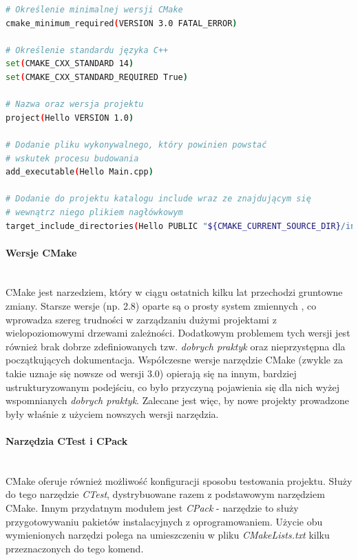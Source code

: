 \begin{lstlisting}[language=bash,caption={Przykład prostego pliku CMakeLists.txt przeznaczonego do budowania programu napisanego w C++}, label={lst:hello}]
# Określenie minimalnej wersji CMake
cmake_minimum_required(VERSION 3.0 FATAL_ERROR)

# Określenie standardu języka C++
set(CMAKE_CXX_STANDARD 14)
set(CMAKE_CXX_STANDARD_REQUIRED True)

# Nazwa oraz wersja projektu
project(Hello VERSION 1.0)

# Dodanie pliku wykonywalnego, który powinien powstać
# wskutek procesu budowania
add_executable(Hello Main.cpp)

# Dodanie do projektu katalogu include wraz ze znajdującym się 
# wewnątrz niego plikiem nagłówkowym
target_include_directories(Hello PUBLIC "${CMAKE_CURRENT_SOURCE_DIR}/include")
\end{lstlisting}

\paragraph*{Wersje CMake}\mbox{} \\
CMake jest narzedziem, który w ciągu ostatnich kilku lat przechodzi gruntowne zmiany. Starsze wersje (np. 2.8) oparte są o prosty system zmiennych \cite{CMakeRight}, co wprowadza szereg trudności w zarządzaniu dużymi projektami z wielopoziomowymi drzewami zależności. Dodatkowym problemem tych wersji jest również brak dobrze zdefiniowanych tzw. \textit{dobrych praktyk} oraz nieprzystępna dla początkujących dokumentacja. Współczesne wersje narzędzie CMake (zwykle za takie uznaje się nowsze od wersji 3.0) opierają się na innym, bardziej ustrukturyzowanym \cite{CMakeRight} podejściu, co było przyczyną pojawienia się dla nich wyżej wspomnianych \textit{dobrych praktyk}. Zalecane jest więc, by nowe projekty prowadzone były właśnie z użyciem nowszych wersji narzędzia.

\paragraph*{Narzędzia CTest i CPack}\mbox{} \\
CMake oferuje również możliwość konfiguracji sposobu testowania projektu. Służy do tego narzędzie \textit{CTest}, dystrybuowane razem z podstawowym narzędziem CMake. Innym przydatnym modułem jest \textit{CPack} - narzędzie to służy przygotowywaniu pakietów instalacyjnych z oprogramowaniem. Użycie obu wymienionych narzędzi polega na umieszczeniu w pliku \textit{CMakeLists.txt} kilku przeznaczonych do tego komend. \par 


